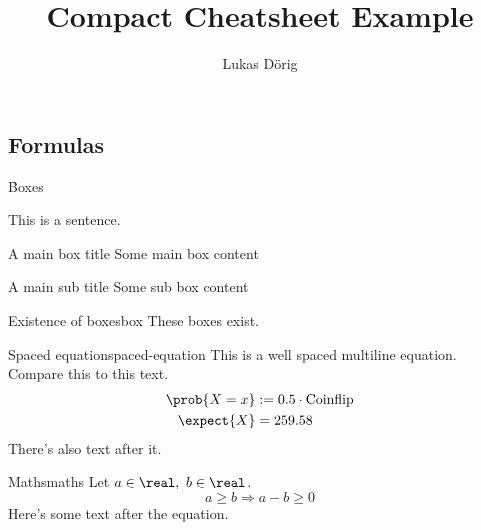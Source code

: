\def\lutilpath{../..}



\title{Compact Cheatsheet Example}
\author{Lukas Dörig}





\begin{multicols*}{3}

  \maketitle

  \part{Formulas}

  \h{Boxes}


  This is a sentence.

  \begin{mainbox}{A main box title}
    Some main box content
  \end{mainbox}

  \begin{subbox}{A main sub title}
    Some sub box content
  \end{subbox}


  \begin{axiom}{Existence of boxes}{box}
    These boxes exist.
  \end{axiom}

  \begin{definition}{Spaced equation}{spaced-equation}
    This is a well spaced multiline equation. Compare this to this text.
    \begin{align*}
      \prob{X = x} & := 0.5 \cdot \text{Coinflip} \\
      \expect{X} & = 259.58
    \end{align*}
    There's also text after it.
  \end{definition}

  \begin{corollary}{Maths}{maths}
    Let $a \in \real,\ b \in \real$.
    \[
      a \geq b \Rightarrow a - b \geq 0
    \]
    Here's some text after the equation.
  \end{corollary}


\end{multicols*}
